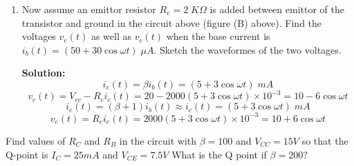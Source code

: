 \begin{enumerate}
{\bf Note:} As the convention in the schematics of transistor circuits,
the bottom horizontal line is treated as the ground, and all voltages,
such as $V_b$, $V_c$ and $V_e$ are measured with respect to the 
ground as the reference point.

{\bf Hint:} The relationship $I_C=\beta I_B$ is only valid in the
linear region in the middle range of the load line. However, in 
the cut-off region (close to the horizontal axis) and the saturation
region (close to the vertical axis), the above relationship no
longer holds and the actual output current $I_c$ and $V_{CE}$ can
only be found graphically in the output characteristic plot.


 {\bf Solution:}
 \begin{itemize}
 \item 
 \[ i_c(t)=\beta i_b(t)=(5+3\cos \omega t)\;mA \]
 \[ v_c(t)=V_{cc}-R_c i_c(t)=20-2000 (5+3\cos \omega t)\times 10^{-3}
    =10-6\cos \omega t  \]
 \item
 \[ i_c(t)=\beta i_b(t)=(1+3\cos \omega t)\;mA \]
 \[ v_c(t)=V_{cc}-R_c i_c(t)=20-2000 (9+3\cos \omega t)\times 10^{-3}
    =2-6\cos \omega t  \]
 Clipping happens during the negative half-cycle due to saturation.
 \item
 \[ i_c(t)=\beta i_b(t)=(10+3\cos \omega t)\;mA \]
 \[ v_c(t)=V_{cc}-R_c i_c(t)=20-2000 (1+3\cos \omega t)\times 10^{-3}
    =18-6\cos \omega t  \]
 Clipping happens during the positive half-cycle due to cut-off.
 \end{itemize}

\item Now assume an emittor resistor $R_e=2\;K\Omega$ is added between 
emittor of the transistor and ground in the circuit above (figure (B)
above).  Find the voltages $v_e(t)$ as well as $v_c(t)$ when the base
current is $i_b(t)=(50+30 \cos \omega t)\;\mu A$. Sketch the waveformes
of the two voltages.

 {\bf Solution:}
 \[ i_c(t)=\beta i_b(t)=(5+3\cos \omega t)\;mA \]
 \[ v_c(t)=V_{cc}-R_c i_c(t)=20-2000 (5+3\cos \omega t)\times 10^{-3}
    =10-6\cos \omega t  \]
 \[ i_e(t)=(\beta+1) i_b(t)\approx i_c(t)=(5+3\cos \omega t)\;mA \]
 \[ v_e(t)=R_e i_e(t)=2000 (5+3\cos \omega t)\times 10^{-3}
    =10+6\cos \omega t  \]

\end{enumerate}





\item Find values of $R_C$ and $R_B$ in the circuit with $\beta=100$
and $V_{CC}=15V$ so that the Q-point is $I_C=25mA$ and $V_{CE}=7.5V$
What is the Q point if $\beta=200$?

